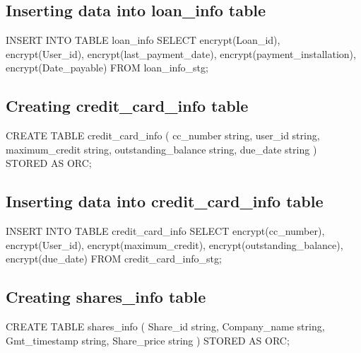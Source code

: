 \subsection{Inserting data into loan\_info table}

INSERT INTO TABLE loan\_info \newline
SELECT encrypt(Loan\_id), \newline
encrypt(User\_id), \newline
encrypt(last\_payment\_date), \newline
encrypt(payment\_installation), \newline
encrypt(Date\_payable) \newline
FROM loan\_info\_stg; \newline

\subsection{Creating credit\_card\_info table}
CREATE TABLE credit\_card\_info \newline
( \newline
cc\_number string, \newline
user\_id string, \newline
maximum\_credit string, \newline
outstanding\_balance string, \newline
due\_date string \newline
) STORED AS ORC; \newline

\subsection{Inserting data into credit\_card\_info table}
INSERT INTO TABLE credit\_card\_info \newline
SELECT encrypt(cc\_number), \newline
encrypt(User\_id), \newline
encrypt(maximum\_credit), \newline
encrypt(outstanding\_balance), \newline
encrypt(due\_date) \newline
FROM credit\_card\_info\_stg; \newline

\subsection{Creating shares\_info table}
CREATE TABLE shares\_info \newline
( \newline
Share\_id string, \newline
Company\_name string, \newline
Gmt\_timestamp string, \newline
Share\_price string \newline
) STORED AS ORC;\newline

